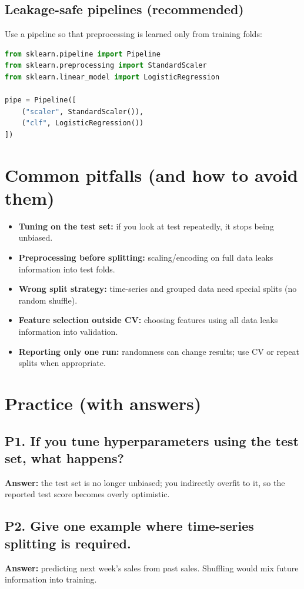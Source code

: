 \documentclass[11pt]{article}
\begin{document}
\subsection{Leakage-safe pipelines (recommended)}
Use a pipeline so that preprocessing is learned only from training folds:
\begin{lstlisting}[language=Python]
from sklearn.pipeline import Pipeline
from sklearn.preprocessing import StandardScaler
from sklearn.linear_model import LogisticRegression

pipe = Pipeline([
    ("scaler", StandardScaler()),
    ("clf", LogisticRegression())
])
\end{lstlisting}

\section{Common pitfalls (and how to avoid them)}
\begin{itemize}[leftmargin=*]
  \item \textbf{Tuning on the test set:} if you look at test repeatedly, it stops being unbiased.
  \item \textbf{Preprocessing before splitting:} scaling/encoding on full data leaks information into test folds.
  \item \textbf{Wrong split strategy:} time-series and grouped data need special splits (no random shuffle).
  \item \textbf{Feature selection outside CV:} choosing features using all data leaks information into validation.
  \item \textbf{Reporting only one run:} randomness can change results; use CV or repeat splits when appropriate.
\end{itemize}

\section{Practice (with answers)}
\subsection*{P1. If you tune hyperparameters using the test set, what happens?}
\textbf{Answer:} the test set is no longer unbiased; you indirectly overfit to it, so the reported test score becomes overly optimistic.

\subsection*{P2. Give one example where time-series splitting is required.}
\textbf{Answer:} predicting next week's sales from past sales. Shuffling would mix future information into training.
\end{document}
